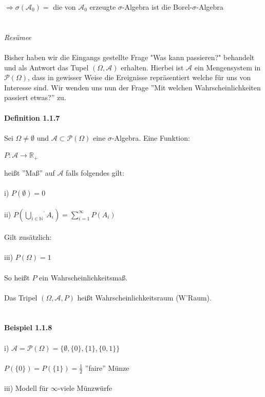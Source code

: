 \documentclass[10pt,a4paper]{report}
\numberwithin{equation}{section}
\numberwithin{figure}{section}
\theoremstyle{plain}
\theoremstyle{definition}
\theoremstyle{plain}
\theoremstyle{definition}
\theoremstyle{remark}
\theoremstyle{plain}
\begin{document}
$\Rightarrow \sigma(\mathcal{A}_0)=$ die von $\mathcal{A}_0$ erzeugte $\sigma$-Algebra ist die Borel-$\sigma$-Algebra\\\\\\
\textit{Resümee}\\\\
Bisher haben wir die Eingangs gestellte Frage "Was kann passieren?" behandelt und als Antwort das Tupel $(\Omega,\mathcal{A})$ erhalten. Hierbei ist $\mathcal{A}$ ein Mengensystem in $\mathcal{P}(\Omega)$, dass in gewisser Weise die Ereignisse repräsentiert welche für uns von Interesse sind. Wir wenden uns nun der Frage ''Mit welchen Wahrscheinlichkeiten passiert etwas?'' zu.\\\\
\textbf{Definition 1.1.7}\\\\
Sei $\Omega \neq \emptyset$ und $\mathcal{A}\subset \mathcal{P}(\Omega)$ eine $\sigma$-Algebra. Eine Funktion:\begin{center}
$P: \mathcal{A} \rightarrow \mathbb{R}_+$
\end{center}
heißt ''Maß'' auf $\mathcal{A}$ falls folgendes gilt:\\\\
i) $P(\emptyset)=0$\\\\
ii) $P\left(\stackrel{\cdot}{\bigcup\limits_{i \in \mathbb{N}}}A_i\right)=\sum\limits_{i=1}^\infty P(A_i)$\\\\
Gilt zusätzlich:\\\\
iii) $P(\Omega)=1$\\\\
So heißt $P$ ein Wahrscheinlichkeitsmaß.\\\\
Das Tripel $(\Omega,\mathcal{A},P)$ heißt Wahrscheinlichkeitsraum (W'Raum).\\\\\\
\textbf{Beispiel 1.1.8}\\\\
i) $\mathcal{A}=\mathcal{P}(\Omega)=\{\emptyset,\{0\},\{1\},\{0,1\}\}$\\\\
\qquad $P(\{0\})=P(\{1\})=\frac{1}{2}$ \qquad ''faire'' Münze\\\\
iii) Modell für $\infty$-viele Münzwürfe\\\\
\end{document}
